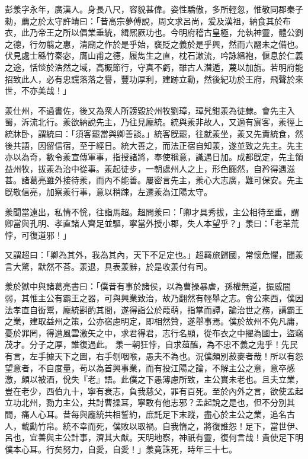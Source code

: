 \begin{pinyinscope}
 
 
 彭羕字永年，廣漢人。身長八尺，容貌甚偉。姿性驕傲，多所輕忽，惟敬同郡秦子勑，薦之於太守許靖曰：「昔高宗夢傅說，周文求呂尚，爰及漢祖，納食其於布衣，此乃帝王之所以倡業垂統，緝熈厥功也。今明府稽古皇極，允執神靈，體公劉之德，行勿翦之惠，清廟之作於是乎始，襃貶之義於是乎興，然而六翮未之備也。伏見處士緜竹秦宓，膺山甫之德，履雋生之直，枕石漱流，吟詠縕袍，偃息於仁義之途，恬惔於浩然之域，高概節行，守真不虧，雖古人潛遁，蔑以加旃。若明府能招致此人，必有忠讜落落之譽，豐功厚利，建跡立勳，然後紀功於王府，飛聲於來世，不亦美哉！」
 
 
 
 
 羕仕州，不過書佐，後又為衆人所謗毀於州牧劉璋，璋髠鉗羕為徒隷。會先主入蜀，泝流北行。羕欲納說先主，乃往見龐統。統與羕非故人，又適有賔客，羕徑上統牀卧，謂統曰：「須客罷當與卿善談。」統客旣罷，往就羕坐，羕又先責統食，然後共語，因留信宿，至于經日。統大善之，而法正宿自知羕，遂並致之先主。先主亦以為奇，數令羕宣傳軍事，指授諸將，奉使稱意，識遇日加。成都旣定，先主領益州牧，拔羕為治中從事。羕起徒步，一朝處州人之上，形色嚻然，自矜得遇滋甚。諸葛亮雖外接待羕，而內不能善。屢密言先主，羕心大志廣，難可保安。先主旣敬信亮，加察羕行事，意以稍踈，左遷羕為江陽太守。
 
 
 
 
 羕聞當遠出，私情不恱，往詣馬超。超問羕曰：「卿才具秀拔，主公相待至重，謂卿當與孔明、孝直諸人齊足並驅，寧當外授小郡，失人本望乎？」羕曰：「老革荒悖，可復道邪！」
 
 
 又謂超曰：「卿為其外，我為其內，天下不足定也。」超羇旅歸國，常懷危懼，聞羕言大驚，默然不荅。羕退，具表羕辭，於是收羕付有司。
 
 
羕於獄中與諸葛亮書曰：「僕昔有事於諸侯，以為曹操暴虐，孫權無道，振威闇弱，其惟主公有霸王之器，可與興業致治，故乃翻然有輕舉之志。會公來西，僕因法孝直自衒鬻，龐統斟酌其間，遂得詣公於葭萌，指掌而譚，論治世之務，講霸王之業，建取益州之策，公亦宿慮明定，即相然贊，遂舉事焉。僕於故州不免凡庸，憂於罪罔，得遭風雲激矢之中，求君得君，志行名顯，從布衣之中擢為國士，盜竊茂才。分子之厚，誰復過此。
 羕一朝狂悖，自求葅醢，為不忠不義之鬼乎！先民有言，左手據天下之圖，右手刎咽喉，愚夫不為也。況僕頗別菽麥者哉！所以有怨望意者，不自度量，苟以為首興事業，而有投江陽之論，不解主公之意，意卒感激，頗以被酒，侻失『老』語。此僕之下愚薄慮所致，主公實未老也。且夫立業，豈在老少，西伯九十，寧有衰志，負我慈父，罪有百死。至於內外之言，欲使孟起立功北州，勠力主公，共討曹操耳，寧敢有他志邪？孟起說之是也，但不分別其間，痛人心耳。昔每與龐統共相誓約，庶託足下末蹤，盡心於主公之業，追名古人，載勳竹帛。統不幸而死，僕敗以取禍。自我惰之，將復誰怨！足下，當世伊、呂也，宜善與主公計事，濟其大猷。天明地察，神祇有靈，復何言哉！貴使足下明僕本心耳。行矣努力，自愛，自愛！」羕竟誅死，時年三十七。
 
 
\end{pinyinscope}